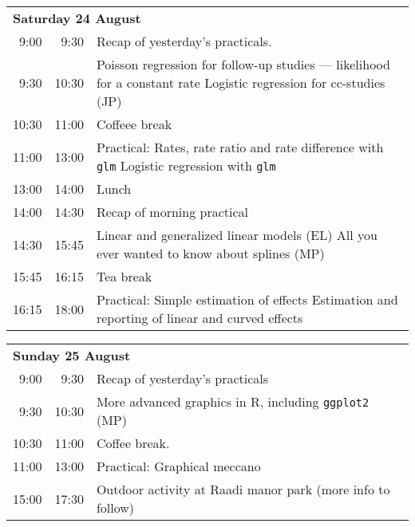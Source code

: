 \noindent
\begin{tabular}{r@{ -- }rp{13cm}}
\multicolumn{3}{l}{\bf Saturday 24 August} \\
 9:00 &  9:30 & Recap of yesterday's practicals. \\
 9:30 & 10:30 & Poisson regression for follow-up studies ---
                likelihood for a constant rate \newline
                Logistic regression for cc-studies (JP) \\
10:30 & 11:00 & Coffeee break \\
11:00 & 13:00 & Practical: Rates, rate ratio and rate difference with \texttt{glm}\newline
                Logistic regression with \texttt{glm} \\
13:00 & 14:00 & Lunch \\
14:00 & 14:30 & Recap of morning practical \\
14:30 & 15:45 & Linear and generalized linear models (EL) \newline
                All you ever wanted to know about splines (MP) \\
15:45 & 16:15 & Tea break\\
16:15 & 18:00 & Practical: Simple estimation of effects \newline
                Estimation and reporting of linear and curved effects \\[1em]
\end{tabular}

\noindent
\begin{tabular}{r@{ -- }rp{13cm}}
 \multicolumn{3}{l}{\bf Sunday 25 August} \\
 9:00 &  9:30 & Recap of yesterday's practicals \\
 9:30 & 10:30 & More advanced graphics in R, including \texttt{ggplot2} (MP)\\
10:30 & 11:00 & Coffee break. \\
11:00 & 13:00 & Practical: Graphical meccano \\
15:00 & 17:30 & Outdoor activity at Raadi manor park (more info to follow)\\[1em]
\end{tabular}

